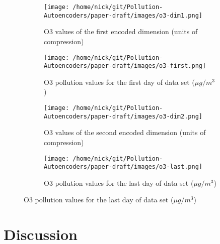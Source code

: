 \documentclass{article}
\begin{document}
\begin{figure}[h!]
    \caption{Geographic comparison of model embedding values versus daily pollution levels}
    \label{fig:outliers_vs_dense_cities}
\begin{subfigure}{0.5\textwidth}
    \centering
    \texttt{[image: /home/nick/git/Pollution-Autoencoders/paper-draft/images/o3-dim1.png]} 
    \caption{O3 values of the first encoded dimension (units of compression)}
    \label{fig:outliers}
\end{subfigure}
\begin{subfigure}{0.5\textwidth}
    \centering
    \texttt{[image: /home/nick/git/Pollution-Autoencoders/paper-draft/images/o3-first.png]}
    \caption{O3 pollution values for the first day of data set ($\mu g/m^3$)}
    \label{fig:dense_cities}
\end{subfigure}
\begin{subfigure}{0.5\textwidth}
    \centering
    \texttt{[image: /home/nick/git/Pollution-Autoencoders/paper-draft/images/o3-dim2.png]} 
    \caption{O3 values of the second encoded dimension (units of compression)}
    \label{fig:outliers}
\end{subfigure}
\begin{subfigure}{0.5\textwidth}
    \centering
    \texttt{[image: /home/nick/git/Pollution-Autoencoders/paper-draft/images/o3-last.png]}
    \caption{O3 pollution values for the last day of data set ($\mu g/m^3$)}
    \label{fig:dense_cities}
\end{subfigure}
\end{figure}

\newpage

\section{Discussion}
\end{document}
